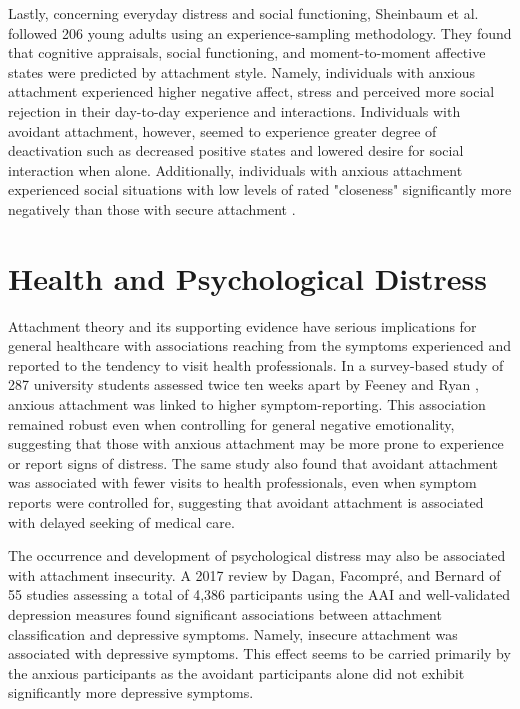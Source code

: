 \documentclass[12pt]{report}
\begin{document}
Lastly, concerning everyday distress and social functioning, Sheinbaum et al. \citeyear{Sheinbaum2015} followed 206 young adults using an experience-sampling methodology.
They found that cognitive appraisals, social functioning, and moment-to-moment affective states were predicted by attachment style.
Namely, individuals with anxious attachment experienced higher negative affect, stress and perceived more social rejection in their day-to-day experience and interactions. Individuals with avoidant attachment, however, seemed to experience greater degree of deactivation such as decreased positive states and lowered desire for social interaction when alone.
Additionally, individuals with anxious attachment experienced social situations with low levels of rated "closeness" significantly more negatively than those with secure attachment \cite{Sheinbaum2015}.

\section{Health and Psychological Distress}
Attachment theory and its supporting evidence have serious implications for general healthcare with associations reaching from the symptoms experienced and reported to the tendency to visit health professionals.
In a survey-based study of 287 university students assessed twice ten weeks apart by Feeney and Ryan \citeyear{Feeney1994}, anxious attachment was linked to higher symptom-reporting. This association remained robust even when controlling for general negative emotionality, suggesting that those with anxious attachment may be more prone to experience or report signs of distress.
The same study also found that avoidant attachment was associated with fewer visits to health professionals, even when symptom reports were controlled for, suggesting that avoidant attachment is associated with delayed seeking of medical care.

The occurrence and development of psychological distress may also be associated with attachment insecurity. A 2017 review by Dagan, Facompré, and Bernard \citeyear{Dagan2018} of 55 studies assessing a total of 4,386 participants using the AAI and well-validated depression measures found significant associations between attachment classification and depressive symptoms.
Namely, insecure attachment was associated with depressive symptoms. This effect seems to be carried primarily by the anxious participants as the avoidant participants alone did not exhibit significantly more depressive symptoms.
\end{document}
